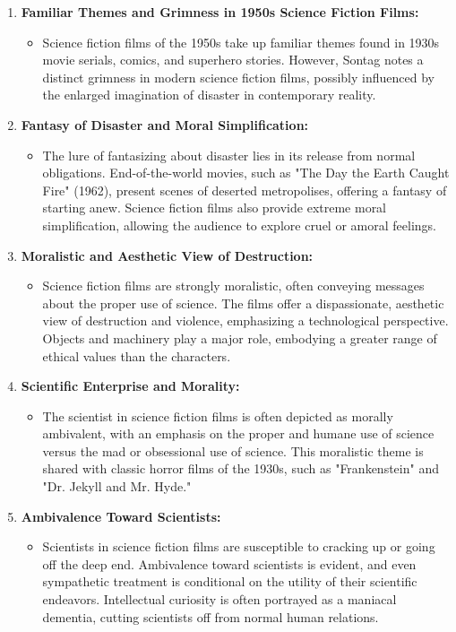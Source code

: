 \documentclass[11pt,fleqn]{book} %
\begin{document}
\begin{enumerate}[label=\arabic*.]
    \item \textbf{Familiar Themes and Grimness in 1950s Science Fiction Films:}
    \begin{itemize}
        \item Science fiction films of the 1950s take up familiar themes found in 1930s movie serials, comics, and superhero stories. However, Sontag notes a distinct grimness in modern science fiction films, possibly influenced by the enlarged imagination of disaster in contemporary reality.
    \end{itemize}

    \item \textbf{Fantasy of Disaster and Moral Simplification:}
    \begin{itemize}
        \item The lure of fantasizing about disaster lies in its release from normal obligations. End-of-the-world movies, such as "The Day the Earth Caught Fire" (1962), present scenes of deserted metropolises, offering a fantasy of starting anew. Science fiction films also provide extreme moral simplification, allowing the audience to explore cruel or amoral feelings.
    \end{itemize}

    \item \textbf{Moralistic and Aesthetic View of Destruction:}
    \begin{itemize}
        \item Science fiction films are strongly moralistic, often conveying messages about the proper use of science. The films offer a dispassionate, aesthetic view of destruction and violence, emphasizing a technological perspective. Objects and machinery play a major role, embodying a greater range of ethical values than the characters.
    \end{itemize}

    \item \textbf{Scientific Enterprise and Morality:}
    \begin{itemize}
        \item The scientist in science fiction films is often depicted as morally ambivalent, with an emphasis on the proper and humane use of science versus the mad or obsessional use of science. This moralistic theme is shared with classic horror films of the 1930s, such as "Frankenstein" and "Dr. Jekyll and Mr. Hyde."
    \end{itemize}

    \item \textbf{Ambivalence Toward Scientists:}
    \begin{itemize}
        \item Scientists in science fiction films are susceptible to cracking up or going off the deep end. Ambivalence toward scientists is evident, and even sympathetic treatment is conditional on the utility of their scientific endeavors. Intellectual curiosity is often portrayed as a maniacal dementia, cutting scientists off from normal human relations.
    \end{itemize}


\end{enumerate}
\end{document}
